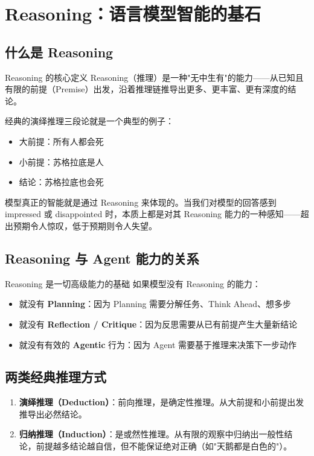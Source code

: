 \section{Reasoning：语言模型智能的基石}

\subsection{什么是 Reasoning}

\begin{importantbox}{Reasoning 的核心定义}
Reasoning（推理）是一种"无中生有"的能力——从已知且有限的前提（Premise）出发，沿着推理链推导出更多、更丰富、更有深度的结论。
\end{importantbox}

经典的演绎推理三段论就是一个典型的例子：
\begin{itemize}
    \item 大前提：所有人都会死
    \item 小前提：苏格拉底是人
    \item 结论：苏格拉底也会死
\end{itemize}

模型真正的智能就是通过 Reasoning 来体现的。当我们对模型的回答感到 impressed 或 disappointed 时，本质上都是对其 Reasoning 能力的一种感知——超出预期令人惊叹，低于预期则令人失望。

\subsection{Reasoning 与 Agent 能力的关系}

\begin{knowledgebox}{Reasoning 是一切高级能力的基础}
如果模型没有 Reasoning 的能力：
\begin{itemize}
    \item 就没有 \textbf{Planning}：因为 Planning 需要分解任务、Think Ahead、想多步
    \item 就没有 \textbf{Reflection / Critique}：因为反思需要从已有前提产生大量新结论
    \item 就没有有效的 \textbf{Agentic} 行为：因为 Agent 需要基于推理来决策下一步动作
\end{itemize}
\end{knowledgebox}

\subsection{两类经典推理方式}

\begin{enumerate}
    \item \textbf{演绎推理（Deduction）}：前向推理，是确定性推理。从大前提和小前提出发推导出必然结论。
    \item \textbf{归纳推理（Induction）}：是或然性推理。从有限的观察中归纳出一般性结论，前提越多结论越自信，但不能保证绝对正确（如"天鹅都是白色的"）。
\end{enumerate}

